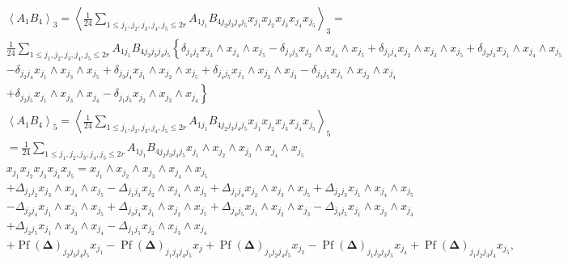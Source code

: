 \documentclass[aps,preprint]{revtex4}%
\begin{document}
\begin{align}
&  \left\langle A_{1}B_{4}\right\rangle _{3}=\left\langle \frac{1}{24}%
\sum_{1\leq j_{1},j_{2},j_{3},j_{4},j_{5}\leq2r}A_{1j_{1}}B_{4j_{2}j_{3}%
j_{4}j_{5}}x_{j_{1}}x_{j_{2}}x_{j_{3}}x_{j_{4}}x_{j_{5}}\right\rangle _{3}=\\
&  \frac{1}{24}\sum_{1\leq j_{1},j_{2},j_{3},j_{4},j_{5}\leq2r}A_{1j_{1}%
}B_{4j_{2}j_{3}j_{4}j_{5}}\left\{  \delta_{j_{1}j_{2}}x_{j_{3}}\wedge
x_{j_{4}}\wedge x_{j_{5}}-\delta_{j_{1}j_{3}}x_{j_{2}}\wedge x_{j_{4}}\wedge
x_{j_{5}}+\delta_{j_{1}j_{4}}x_{j_{2}}\wedge x_{j_{3}}\wedge x_{j_{5}}%
+\delta_{j_{2}j_{3}}x_{j_{1}}\wedge x_{j_{4}}\wedge x_{j_{5}}\right. \\
&  -\delta_{j_{2}j_{4}}x_{j_{1}}\wedge x_{j_{3}}\wedge x_{j_{5}}+\delta
_{j_{3}j_{4}}x_{j_{1}}\wedge x_{j_{2}}\wedge x_{j_{5}}+\delta_{j_{4}j_{5}%
}x_{j_{1}}\wedge x_{j_{2}}\wedge x_{j_{3}}-\delta_{j_{3}j_{5}}x_{j_{1}}\wedge
x_{j_{2}}\wedge x_{j_{4}}\\
&  +\left.  \delta_{j_{2}j_{5}}x_{j_{1}}\wedge x_{j_{3}}\wedge x_{j_{4}%
}-\delta_{j_{1}j_{5}}x_{j_{2}}\wedge x_{j_{3}}\wedge x_{j_{4}}\right\} \\
&  \left\langle A_{1}B_{4}\right\rangle _{5}=\left\langle \frac{1}{24}%
\sum_{1\leq j_{1},j_{2},j_{3},j_{4},j_{5}\leq2r}A_{1j_{1}}B_{4j_{2}j_{3}%
j_{4}j_{5}}x_{j_{1}}x_{j_{2}}x_{j_{3}}x_{j_{4}}x_{j_{5}}\right\rangle _{5}\\
&  =\frac{1}{24}\sum_{1\leq j_{1},j_{2},j_{3},j_{4},j_{5}\leq2r}A_{1j_{1}%
}B_{4j_{2}j_{3}j_{4}j_{5}}x_{j_{1}}\wedge x_{j_{2}}\wedge x_{j_{3}}\wedge
x_{j_{4}}\wedge x_{j_{5}}%
\end{align}%
\begin{align}
&  x_{j_{1}}x_{j_{2}}x_{j_{3}}x_{j_{4}}x_{j_{5}}=x_{j_{1}}\wedge x_{j_{2}%
}\wedge x_{j_{3}}\wedge x_{j_{4}}\wedge x_{j_{5}}\nonumber\\
&  +\Delta_{j_{1}j_{2}}x_{j_{3}}\wedge x_{j_{4}}\wedge x_{j_{5}}-\Delta
_{j_{1}j_{3}}x_{j_{2}}\wedge x_{j_{4}}\wedge x_{j_{5}}+\Delta_{j_{1}j_{4}%
}x_{j_{2}}\wedge x_{j_{3}}\wedge x_{j_{5}}+\Delta_{j_{2}j_{3}}x_{j_{1}}\wedge
x_{j_{4}}\wedge x_{j_{5}}\nonumber\\
&  -\Delta_{j_{2}j_{4}}x_{j_{1}}\wedge x_{j_{3}}\wedge x_{j_{5}}+\Delta
_{j_{3}j_{4}}x_{j_{1}}\wedge x_{j_{2}}\wedge x_{j_{5}}+\Delta_{j_{4}j_{5}%
}x_{j_{1}}\wedge x_{j_{2}}\wedge x_{j_{3}}-\Delta_{j_{3}j_{5}}x_{j_{1}}\wedge
x_{j_{2}}\wedge x_{j_{4}}\nonumber\\
&  +\Delta_{j_{2}j_{5}}x_{j_{1}}\wedge x_{j_{3}}\wedge x_{j_{4}}-\Delta
_{j_{1}j_{5}}x_{j_{2}}\wedge x_{j_{3}}\wedge x_{j_{4}}\nonumber\\
&  +\operatorname*{Pf}\left(  \mathbf{\Delta}\right)  _{j_{2}j_{3}j_{4}j_{5}%
}x_{j_{1}}-\operatorname*{Pf}\left(  \mathbf{\Delta}\right)  _{j_{1}j_{3}%
j_{4}j_{5}}x_{j}+\operatorname*{Pf}\left(  \mathbf{\Delta}\right)
_{j_{1}j_{2}j_{4}j_{5}}x_{j_{3}}-\operatorname*{Pf}\left(  \mathbf{\Delta
}\right)  _{j_{1}j_{2}j_{3}j_{5}}x_{j_{4}}+\operatorname*{Pf}\left(
\mathbf{\Delta}\right)  _{j_{1}j_{2}j_{3}j_{4}}x_{j_{5}},
\end{align}%
\end{document}
